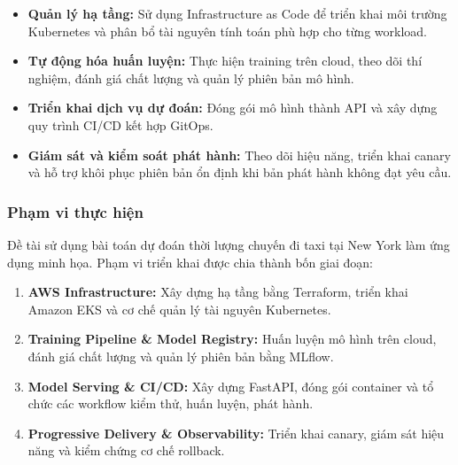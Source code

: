 \begin{itemize}

\item 

\textbf{Quản lý hạ tầng:} Sử dụng Infrastructure as Code để triển khai môi trường Kubernetes và phân bổ tài nguyên tính toán phù hợp cho từng workload.


\item 

\textbf{Tự động hóa huấn luyện:} Thực hiện training trên cloud, theo dõi thí nghiệm, đánh giá chất lượng và quản lý phiên bản mô hình.


\item 

\textbf{Triển khai dịch vụ dự đoán:} Đóng gói mô hình thành API và xây dựng quy trình CI/CD kết hợp GitOps.


\item 

\textbf{Giám sát và kiểm soát phát hành:} Theo dõi hiệu năng, triển khai canary và hỗ trợ khôi phục phiên bản ổn định khi bản phát hành không đạt yêu cầu.


\end{itemize}

\subsubsection{Phạm vi thực hiện}


Đề tài sử dụng bài toán dự đoán thời lượng chuyến đi taxi tại New York làm ứng dụng minh họa. Phạm vi triển khai được chia thành bốn giai đoạn:


\begin{enumerate}

\item 

\textbf{AWS Infrastructure:} Xây dựng hạ tầng bằng Terraform, triển khai Amazon EKS và cơ chế quản lý tài nguyên Kubernetes.


\item 

\textbf{Training Pipeline \& Model Registry:} Huấn luyện mô hình trên cloud, đánh giá chất lượng và quản lý phiên bản bằng MLflow.


\item 

\textbf{Model Serving \& CI/CD:} Xây dựng FastAPI, đóng gói container và tổ chức các workflow kiểm thử, huấn luyện, phát hành.


\item 

\textbf{Progressive Delivery \& Observability:} Triển khai canary, giám sát hiệu năng và kiểm chứng cơ chế rollback.


\end{enumerate}

